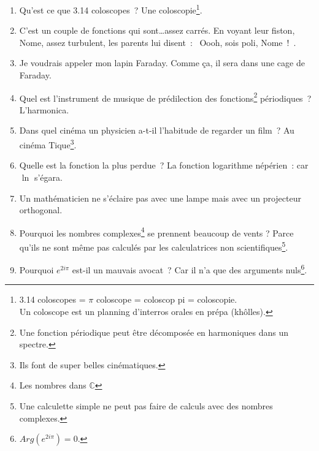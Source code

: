 \documentclass[10pt,a5paper,fullpage]{book}
\begin{document}
\begin{enumerate}
		\item Qu’est ce que 3.14 coloscopes~? Une coloscopie\footnote{3.14 coloscopes = $\pi$ coloscope = coloscop pi = coloscopie. \\Un coloscope est un planning d’interros orales en prépa (khôlles).}.
		\item C’est un couple de fonctions qui sont\ldots assez carrés. En voyant leur fiston, Nome, assez turbulent, les parents lui disent~: \guillemotleft~Oooh, sois poli, Nome~!~\guillemotright.
		\item Je voudrais appeler mon lapin Faraday. Comme ça, il sera dans une cage de Faraday.
		\item Quel est l’instrument de musique de prédilection des fonctions\footnote{Une fonction périodique peut être décomposée en harmoniques dans un spectre.} périodiques~? L’harmonica.
		\item Dans quel cinéma un physicien a-t-il l’habitude de regarder un film~? Au cinéma Tique\footnote{Ils font de super belles cinématiques.}.
		\item Quelle est la fonction la plus perdue~? La fonction logarithme népérien~: car $\ln$ s’égara.
		\item Un mathématicien ne s’éclaire pas avec une lampe mais avec un projecteur orthogonal.
		\item Pourquoi les nombres complexes\footnote{Les nombres dans $\mathbb{C}$} se prennent beaucoup de vents ? Parce qu'ils ne sont même pas calculés par les calculatrices non scientifiques\footnote{Une calculette simple ne peut pas faire de calculs avec des nombres complexes.}.
		\item Pourquoi $e^{2i\pi}$ est-il un mauvais avocat~? Car il n’a que des arguments nuls\footnote{$Arg(e^{2i\pi}) = 0$.}. 

\end{enumerate}
\end{document}
